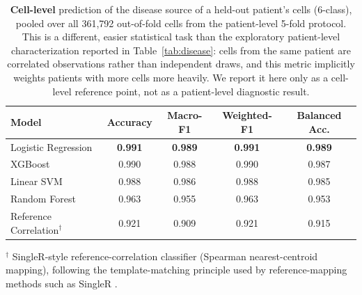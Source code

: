 \begin{table}[ht]
\centering
\small
\renewcommand{\arraystretch}{1.10}

\begin{tabular*}{\columnwidth}{@{\extracolsep{\fill}}lcccc@{}}
\toprule
\textbf{Model}
& \textbf{Accuracy}
& \textbf{Macro-F1}
& \textbf{Weighted-F1}
& \textbf{Balanced Acc.} \\
\midrule

Logistic Regression
& \textbf{0.991}
& \textbf{0.989}
& \textbf{0.991}
& \textbf{0.989} \\

XGBoost
& 0.990
& 0.988
& 0.990
& 0.987 \\

Linear SVM
& 0.988
& 0.986
& 0.988
& 0.985 \\

Random Forest
& 0.963
& 0.955
& 0.963
& 0.953 \\

Reference Correlation$^\dagger$
& 0.921
& 0.909
& 0.921
& 0.915 \\

\bottomrule
\end{tabular*}

\vspace{3pt}

\parbox{\columnwidth}{
\footnotesize
$^\dagger$ SingleR-style reference-correlation classifier
(Spearman nearest-centroid mapping), following the template-matching
principle used by reference-mapping methods such as
SingleR \citep{aran2019reference}.
}

\caption{
\textbf{Cell-level} prediction of the disease source of a held-out
patient's cells (6-class), pooled over all 361{,}792 out-of-fold cells
from the patient-level 5-fold protocol. This is a different, easier
statistical task than the exploratory patient-level characterization reported in
Table~\ref{tab:disease}: cells from the same patient are correlated
observations rather than independent draws, and this metric implicitly
weights patients with more cells more heavily. We report it here only as
a cell-level reference point, not as a patient-level diagnostic result.
}
\label{tab:disease_cell_level}

\end{table}
